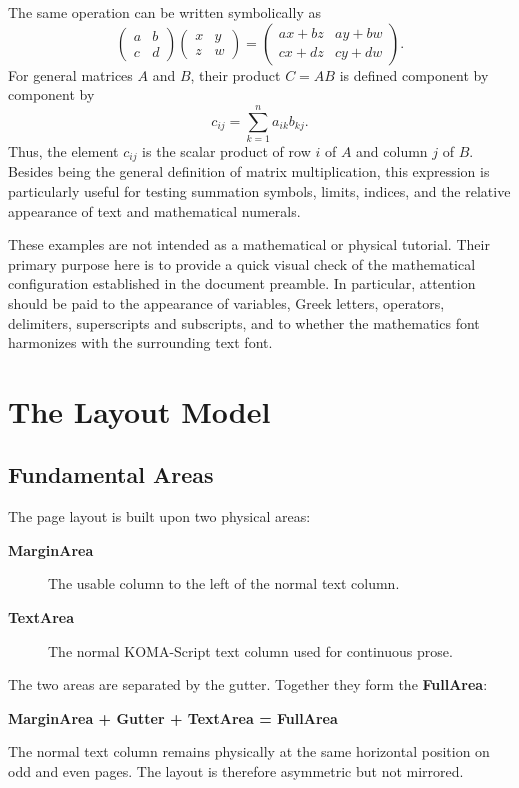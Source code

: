 \documentclass[
11pt,
a4paper,
oneside
]{scrbook}
\begin{document}
The same operation can be written symbolically as
\begin{equation}
	\begin{pmatrix}
		a & b \\
		c & d
	\end{pmatrix}
	\begin{pmatrix}
		x & y \\
		z & w
	\end{pmatrix}
	=
	\begin{pmatrix}
		ax+bz & ay+bw \\
		cx+dz & cy+dw
	\end{pmatrix}.
	\tag{4.19}
\end{equation}
For general matrices $A$ and $B$, their product $C=AB$ is defined
component by component by
\begin{equation}
	c_{ij}
	=
	\sum_{k=1}^{n} a_{ik}b_{kj}.
	\tag{4.20}
\end{equation}
Thus, the element $c_{ij}$ is the scalar product of row $i$ of $A$ and
column $j$ of $B$. Besides being the general definition of matrix
multiplication, this expression is particularly useful for testing
summation symbols, limits, indices, and the relative appearance of
text and mathematical numerals.

These examples are not intended as a mathematical or physical tutorial. Their primary purpose here is to provide a quick visual check of the mathematical configuration established in the document preamble. In particular, attention should be paid to the appearance of variables, Greek letters, operators, delimiters, superscripts and subscripts, and to whether the mathematics font harmonizes with the surrounding text font.


\chapter{The Layout Model}
\label{chap:layout-model}

\section{Fundamental Areas}
The page layout is built upon two physical areas:
\begin{description}
	\item[\textbf{MarginArea}]
	The usable column to the left of the normal text column.
	
	\item[\textbf{TextArea}]
	The normal KOMA-Script text column used for continuous prose.
\end{description}
The two areas are separated by the gutter.
Together they form the \textbf{FullArea}:
\begin{note}
	\textbf{MarginArea + Gutter + TextArea = FullArea}
\end{note}
The normal text column remains physically at the same horizontal position on
odd and even pages.
The layout is therefore asymmetric but not mirrored.
\end{document}
